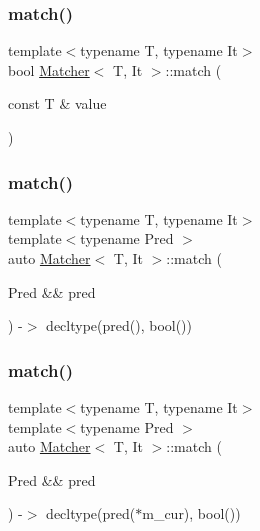 \mbox{\label{class_matcher_ad10d558fa9248baf4490d50ad395a55e}} 
\subsubsection{\texorpdfstring{match()}{match()}\hspace{0.1cm}{\footnotesize\ttfamily [1/6]}}
{\footnotesize\ttfamily template$<$typename T, typename It$>$ \\
bool \hyperlink{class_matcher}{Matcher}$<$ T, It $>$\+::match (\begin{DoxyParamCaption}\item[{const T \&}]{value }\end{DoxyParamCaption})\hspace{0.3cm}{\ttfamily [inline]}}

\mbox{\label{class_matcher_a1f088e17e646f4e53a9d0297b4bd4d8b}} 
\subsubsection{\texorpdfstring{match()}{match()}\hspace{0.1cm}{\footnotesize\ttfamily [2/6]}}
{\footnotesize\ttfamily template$<$typename T, typename It$>$ \\
template$<$typename Pred $>$ \\
auto \hyperlink{class_matcher}{Matcher}$<$ T, It $>$\+::match (\begin{DoxyParamCaption}\item[{Pred \&\&}]{pred }\end{DoxyParamCaption}) -\/$>$ decltype(pred(), bool())
  \hspace{0.3cm}{\ttfamily [inline]}}

\mbox{\label{class_matcher_aae9b912f87795d05054746619e237b2d}} 
\subsubsection{\texorpdfstring{match()}{match()}\hspace{0.1cm}{\footnotesize\ttfamily [3/6]}}
{\footnotesize\ttfamily template$<$typename T, typename It$>$ \\
template$<$typename Pred $>$ \\
auto \hyperlink{class_matcher}{Matcher}$<$ T, It $>$\+::match (\begin{DoxyParamCaption}\item[{Pred \&\&}]{pred }\end{DoxyParamCaption}) -\/$>$ decltype(pred($\ast$m\+\_\+cur), bool())
  \hspace{0.3cm}{\ttfamily [inline]}}

